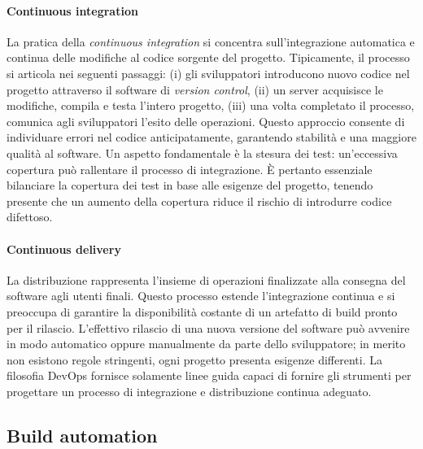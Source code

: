 \paragraph{Continuous integration} La pratica della \textit{continuous integration} si concentra sull'integrazione automatica e continua delle modifiche al codice sorgente del progetto. Tipicamente, il processo si articola nei seguenti passaggi: (i) gli sviluppatori introducono nuovo codice nel progetto attraverso il software di \textit{version control}, (ii) un server acquisisce le modifiche, compila e testa l'intero progetto, (iii) una volta completato il processo, comunica agli sviluppatori l'esito delle operazioni. Questo approccio consente di individuare errori nel codice anticipatamente, garantendo stabilità e una maggiore qualità al software. Un aspetto fondamentale è la stesura dei test: un'eccessiva copertura può rallentare il processo di integrazione. È pertanto essenziale bilanciare la copertura dei test in base alle esigenze del progetto, tenendo presente che un aumento della copertura riduce il rischio di introdurre codice difettoso.


\paragraph{Continuous delivery} La distribuzione rappresenta l'insieme di operazioni finalizzate alla consegna del software agli utenti finali. Questo processo estende l'integrazione continua e si preoccupa di garantire la disponibilità costante di un artefatto di build pronto per il rilascio. L'effettivo rilascio di una nuova versione del software può avvenire in modo automatico oppure manualmente da parte dello sviluppatore; in merito non esistono regole stringenti, ogni progetto presenta esigenze differenti. La filosofia DevOps fornisce solamente linee guida capaci di fornire gli strumenti per progettare un processo di integrazione e distribuzione continua adeguato.

\subsection{Build automation}


